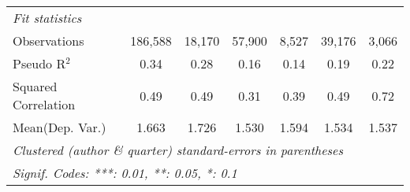\begin{tabular}{lcccccc}
   \midrule
   \emph{Fit statistics}\\
   Observations                                               & 186,588 & 18,170         & 57,900        & 8,527         & 39,176        & 3,066\\  
   Pseudo R$^2$                                               & 0.34    & 0.28           & 0.16          & 0.14          & 0.19          & 0.22\\  
   Squared Correlation                                        & 0.49    & 0.49           & 0.31          & 0.39          & 0.49          & 0.72\\  
Mean(Dep. Var.) & 1.663 & 1.726 & 1.530 & 1.594 & 1.534 & 1.537 \\
   \midrule \midrule
   \multicolumn{7}{l}{\emph{Clustered (author \& quarter) standard-errors in parentheses}}\\
   \multicolumn{7}{l}{\emph{Signif. Codes: ***: 0.01, **: 0.05, *: 0.1}}\\
\end{tabular}
\par\endgroup
